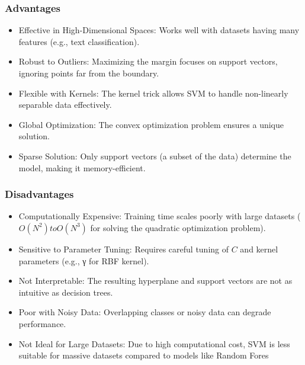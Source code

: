 \smallskip
\subsubsection{Advantages}\textbf{}

\begin{itemize}
    \item Effective in High-Dimensional Spaces: Works well with datasets having many features (e.g., text classification).
    \item Robust to Outliers: Maximizing the margin focuses on support vectors, ignoring points far from the boundary.
    \item Flexible with Kernels: The kernel trick allows SVM to handle non-linearly separable data effectively.
    \item Global Optimization: The convex optimization problem ensures a unique solution.
    \item Sparse Solution: Only support vectors (a subset of the data) determine the model, making it memory-efficient.
\end{itemize}

\subsubsection{Disadvantages}\textbf{}

\begin{itemize}
    \item Computationally Expensive: Training time scales poorly with large datasets ($O(N^2) to O(N^3)$ for solving the quadratic optimization problem).
    \item Sensitive to Parameter Tuning: Requires careful tuning of $C$ and kernel parameters (e.g., γ for RBF kernel).
    \item Not Interpretable: The resulting hyperplane and support vectors are not as intuitive as decision trees.
    \item Poor with Noisy Data: Overlapping classes or noisy data can degrade performance.
    \item Not Ideal for Large Datasets: Due to high computational cost, SVM is less suitable for massive datasets compared to models like Random Fores
\end{itemize}